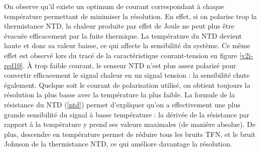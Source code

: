 On observe qu'il existe un optimum de courant correspondant à chaque température permettant de minimiser la résolution. En effet, si on polarise trop la thermistance NTD, la chaleur produite par effet de Joule ne peut plus être évacuée efficacement par la fuite thermique. La température du NTD devient haute et donc sa valeur baisse, ce qui affecte la sensibilité du système. Ce même effet est observé lors du tracé de la caractéristique courant-tension en figure \ref{v2i-red10}. À trop faible courant, le senseur NTD n'est plus assez polarisé pour convertir efficacement le signal chaleur en un signal tension : la sensibilité chute également. Quelque soit le courant de polarisation utilisé, on obtient toujours la résolution la plus basse avec la température la plus faible. La formule de la résistance du NTD (\ref{ntd}) permet d'expliquer qu'on a effectivement une plus grande sensibilité du signal à basse température : la dérivée de la résistance par rapport à la température y prend ses valeurs maximales (de manière absolue). De plus, descendre en température permet de réduire tous les bruits TFN, et le bruit Johnson de la thermistance NTD, ce qui améliore davantage la résolution.

